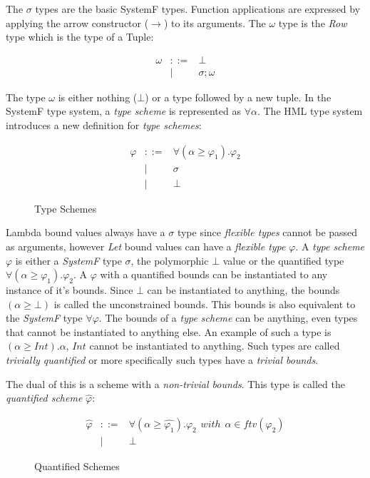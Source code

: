\documentclass[twoside, titlepage, openright, a4paper]{book}
\renewcommand{\geq}{\geqslant}
\begin{document}
The $\sigma$ types are the basic SystemF types. Function applications are expressed by applying the arrow constructor ($\rightarrow$) to its arguments. The $\omega$ type is the \emph{Row} type which is the type of a Tuple:

\begin{eqnarray*}
\omega & ::= & \bot \\
       & | & \sigma ; \omega
\end{eqnarray*}

The type $\omega$ is either nothing ($\bot$) or a type followed by a new tuple.
In the SystemF type system, a \emph{type scheme} is represented as $\forall \alpha$. The HML type system introduces a new definition for \emph{type schemes}:

\begin{figure}[H]
\begin{eqnarray*}
\varphi & ::= & \forall (\alpha \geq \varphi_1). \varphi_2 \\
        & | & \sigma \\
        & | & \bot
\end{eqnarray*}
\caption{Type Schemes}
\label{type-schemes}
\end{figure}

Lambda bound values always have a $\sigma$ type since \emph{flexible types} cannot be passed as arguments, however \emph{Let} bound values can have a \emph{flexible type} $\varphi$.
A \emph{type scheme} $\varphi$ is either a \emph{SystemF} type $\sigma$, the polymorphic $\bot$ value or the quantified type $\forall (\alpha \geq \varphi_1). \varphi_2$. A $\varphi$ with a quantified bounds can be instantiated to any instance of it's bounds. Since $\bot$ can be instantiated to anything, the bounds $(\alpha \geq \bot)$ is called the unconstrained bounds. This bounds is also equivalent to the \emph{SystemF} type $\forall \varphi$. The bounds of a \emph{type scheme} can be anything, even types that cannot be instantiated to anything else. An example of such a type is $(\alpha \geq Int).\alpha$, $Int$ cannot be instantiated to anything. Such types are called \emph{trivially quantified} or more specifically such types have a \emph{trivial bounds}.

The dual of this is a scheme with a \emph{non-trivial bounds}. This type is called the \emph{quantified scheme} $\hat{\varphi}$:

\begin{figure}[H]
\begin{eqnarray*}
\hat{\varphi} & ::= & \forall (\alpha \geq \hat{\varphi_1}). \varphi_2 \hspace{5pt} with \hspace{5pt} \alpha \in ftv(\varphi_2) \\
              & | & \bot
\end{eqnarray*}
\caption{Quantified Schemes}
\label{quantified-schemes}
\end{figure}
\end{document}
